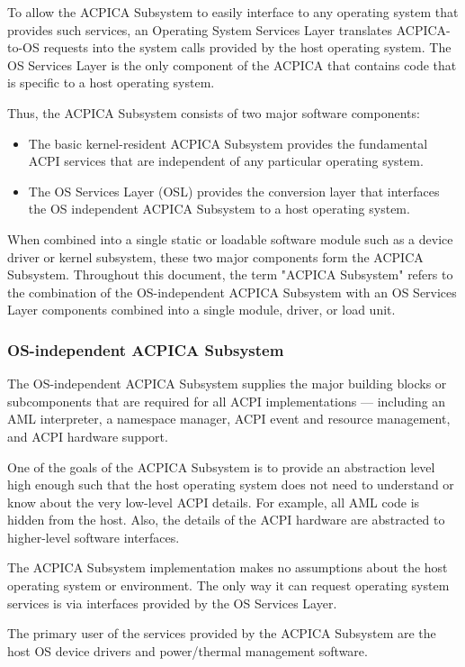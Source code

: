 To allow the ACPICA Subsystem to easily interface to any operating system that provides such
services, an Operating System Services Layer translates ACPICA-to-OS requests into the system
calls provided by the host operating system. The OS Services Layer is the only component of the
ACPICA that contains code that is specific to a host operating system.

Thus, the ACPICA Subsystem consists of two major software components:
\begin{itemize}
	\item The basic kernel-resident ACPICA Subsystem provides the fundamental ACPI services	that are independent of any particular operating system.
	\item The OS Services Layer (OSL) provides the conversion layer that interfaces the OS independent ACPICA Subsystem to a host operating system.
\end{itemize}

When combined into a single static or loadable software module such as a device driver or
kernel subsystem, these two major components form the ACPICA Subsystem. Throughout this
document, the term "ACPICA Subsystem" refers to the combination of the OS-independent
ACPICA Subsystem with an OS Services Layer components combined into a single module,
driver, or load unit.

\subsubsection{OS-independent ACPICA Subsystem}
The OS-independent ACPICA Subsystem supplies the major building blocks or subcomponents that are required for all ACPI implementations — including an AML interpreter, a namespace manager, ACPI event and resource management, and ACPI hardware support.

One of the goals of the ACPICA Subsystem is to provide an abstraction level high enough such
that the host operating system does not need to understand or know about the very low-level ACPI
details. For example, all AML code is hidden from the host. Also, the details of the ACPI hardware
are abstracted to higher-level software interfaces.

The ACPICA Subsystem implementation makes no assumptions about the host operating system or environment. The only way it can request operating system services is via interfaces provided by the OS Services Layer.

The primary user of the services provided by the ACPICA Subsystem are the host OS device drivers and power/thermal management software.


